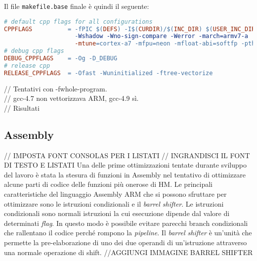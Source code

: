 Il file \verb|makefile.base| finale è quindi il seguente:\\

\begin{lstlisting}[language=make]
# default cpp flags for all configurations
CPPFLAGS          = -fPIC $(DEFS) -I$(CURDIR)/$(INC_DIR) $(USER_INC_DIRS) -Wall 
                    -Wshadow -Wno-sign-compare -Werror -march=armv7-a 
                    -mtune=cortex-a7 -mfpu=neon -mfloat-abi=softfp -pthread
# debug cpp flags
DEBUG_CPPFLAGS    = -Og -D_DEBUG
# release cpp
RELEASE_CPPFLAGS  = -Ofast -Wuninitialized -ftree-vectorize
\end{lstlisting}


// Tentativi con -fwhole-program.\\
// gcc-4.7 non vettorizzava ARM, gcc-4.9 sì.\\
// Risultati\\


\subsection{Assembly}
// IMPOSTA FONT CONSOLAS PER I LISTATI \newline
// INGRANDISCI IL FONT DI TESTO E LISTATI \newline
Una delle prime ottimizzazioni tentate durante sviluppo del lavoro è stata
 la stesura di funzioni in Assembly nel tentativo di ottimizzare alcune parti 
 di codice delle funzioni più onerose di HM.
Le principali caratteristiche del linguaggio Assembly ARM che si possono sfruttare per ottimizzare sono le istruzioni condizionali e il \emph{barrel shifter}. \newline
Le istruzioni condizionali sono normali istruzioni la cui esecuzione dipende dal valore di determinati \emph{flag}. In questo modo è possibile evitare parecchi branch condizionali che rallentano il codice perché rompono la \emph{pipeline}.\newline
Il \emph{barrel shifter} è un'unità che permette la pre-elaborazione di uno dei 
due operandi di un'istruzione attraverso una normale operazione di shift. 
//AGGIUNGI IMMAGINE BARREL SHIFTER \newline
